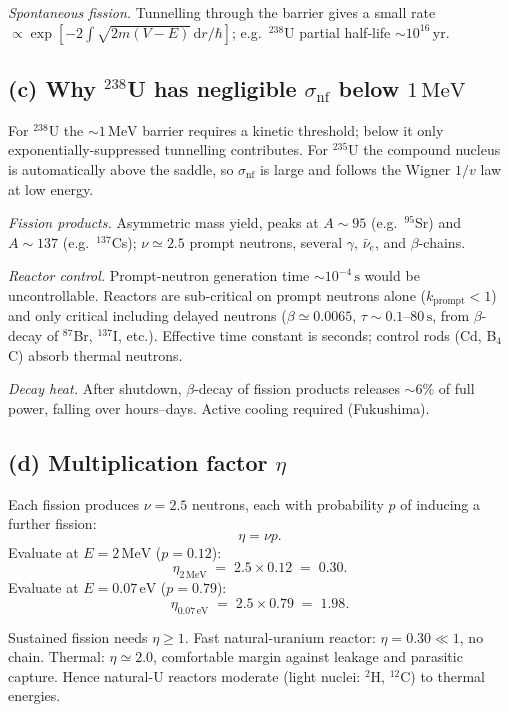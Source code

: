 \documentclass[11pt]{article}
\newcommand{\de}{\mathrm{d}}
\begin{document}
\emph{Spontaneous fission.} Tunnelling through the barrier gives a small rate $\propto\exp[-2\int\sqrt{2m(V-E)}\,\de r/\hbar]$; e.g.\ $^{238}$U partial half-life $\sim 10^{16}\,\text{yr}$.

\subsection*{(c) Why $^{238}$U has negligible $\sigma_\text{nf}$ below $1\,\text{MeV}$}

For $^{238}$U the $\sim 1\,\text{MeV}$ barrier requires a kinetic threshold; below it only exponentially-suppressed tunnelling contributes. For $^{235}$U the compound nucleus is automatically above the saddle, so $\sigma_\text{nf}$ is large and follows the Wigner $1/v$ law at low energy.

\emph{Fission products.} Asymmetric mass yield, peaks at $A\sim 95$ (e.g.\ $^{95}$Sr) and $A\sim 137$ (e.g.\ $^{137}$Cs); $\nu\simeq 2.5$ prompt neutrons, several $\gamma$, $\bar\nu_e$, and $\beta$-chains.

\emph{Reactor control.} Prompt-neutron generation time $\sim 10^{-4}\,\text{s}$ would be uncontrollable. Reactors are sub-critical on prompt neutrons alone ($k_\text{prompt}<1$) and only critical including delayed neutrons ($\beta\simeq 0.0065$, $\tau\sim 0.1$--$80\,\text{s}$, from $\beta$-decay of $^{87}$Br, $^{137}$I, etc.). Effective time constant is seconds; control rods (Cd, B$_4$C) absorb thermal neutrons.

\emph{Decay heat.} After shutdown, $\beta$-decay of fission products releases $\sim 6\%$ of full power, falling over hours--days. Active cooling required (Fukushima).

\subsection*{(d) Multiplication factor $\eta$}

Each fission produces $\nu=2.5$ neutrons, each with probability $p$ of inducing a further fission:
\begin{equation}
\boxed{\;\eta=\nu p.\;}
\end{equation}
Evaluate at $E=2\,\text{MeV}$ ($p=0.12$):
\[
\eta_{2\,\text{MeV}}\;=\;2.5\times 0.12\;=\;0.30.
\]
Evaluate at $E=0.07\,\text{eV}$ ($p=0.79$):
\[
\eta_{0.07\,\text{eV}}\;=\;2.5\times 0.79\;=\;1.98.
\]

Sustained fission needs $\eta\geq 1$. Fast natural-uranium reactor: $\eta=0.30\ll 1$, no chain. Thermal: $\eta\simeq 2.0$, comfortable margin against leakage and parasitic capture. Hence natural-U reactors moderate (light nuclei: $^{2}$H, $^{12}$C) to thermal energies.
\end{document}
